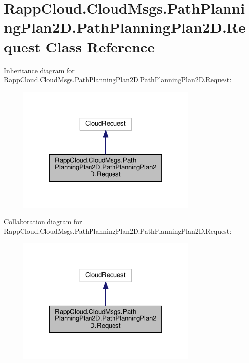 \hypertarget{classRappCloud_1_1CloudMsgs_1_1PathPlanningPlan2D_1_1PathPlanningPlan2D_1_1Request}{\section{Rapp\-Cloud.\-Cloud\-Msgs.\-Path\-Planning\-Plan2\-D.\-Path\-Planning\-Plan2\-D.\-Request Class Reference}
\label{classRappCloud_1_1CloudMsgs_1_1PathPlanningPlan2D_1_1PathPlanningPlan2D_1_1Request}
}


Inheritance diagram for Rapp\-Cloud.\-Cloud\-Msgs.\-Path\-Planning\-Plan2\-D.\-Path\-Planning\-Plan2\-D.\-Request\-:
\nopagebreak
\begin{figure}[H]
\begin{center}
\leavevmode
\includegraphics[width=252pt]{classRappCloud_1_1CloudMsgs_1_1PathPlanningPlan2D_1_1PathPlanningPlan2D_1_1Request__inherit__graph}
\end{center}
\end{figure}


Collaboration diagram for Rapp\-Cloud.\-Cloud\-Msgs.\-Path\-Planning\-Plan2\-D.\-Path\-Planning\-Plan2\-D.\-Request\-:
\nopagebreak
\begin{figure}[H]
\begin{center}
\leavevmode
\includegraphics[width=252pt]{classRappCloud_1_1CloudMsgs_1_1PathPlanningPlan2D_1_1PathPlanningPlan2D_1_1Request__coll__graph}
\end{center}
\end{figure}
